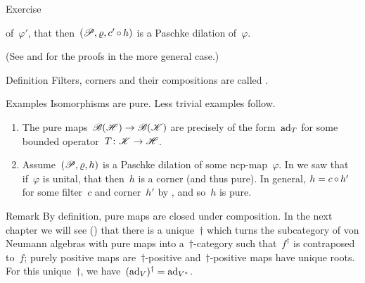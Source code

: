 \documentclass[b]{subfiles}
\begin{document}
\begin{parsec}
\begin{point}{Exercise}
\begin{enumerate}
            of~$\varphi'$,
            that then~$(\mathscr{P}, \varrho, c' \mathop{\circ} h)$
            is a Paschke dilation of~$\varphi$.
\end{enumerate}
(See  and  for the proofs
        in the more general case.)
\end{point}
\begin{point}{Definition}%
Filters, corners and their compositions are called .
\end{point}
\begin{point}{Examples}%
Isomorphisms are pure.  Less trivial examples follow.
\begin{enumerate}
\item
The pure maps~$\mathscr{B}(\mathscr{H}) \to \mathscr{B}(\mathscr{K})$
    are precisely of the form~$\mathrm{ad}_T$
    for some bounded operator~$T\colon \mathscr{K} \to \mathscr{H}$.
\item
Assume~$(\mathscr{P}, \varrho, h)$ is a Paschke dilation of some ncp-map~$\varphi$.
In  we saw that if~$\varphi$ is unital,
        that then~$h$ is a corner (and thus pure).
In general, $h = c \mathop{\circ} h'$ for some filter~$c$ and corner~$h'$
    by ,
        and so~$h$ is pure.
\end{enumerate}
\end{point}
\begin{point}{Remark}%
By definition, pure maps are closed under composition.
In the next chapter we will see () that
    there is a unique~$\dagger$
    which turns the subcategory of von Neumann
    algebras with pure maps into a~$\dagger$-category
    such that~$f^\dagger$ is contraposed to~$f$;
            purely positive maps are~$\dagger$-positive
            and~$\dagger$-positive maps have unique roots.
For this unique~$\dagger$, we have~$(\mathrm{ad}_V)^\dagger = \mathrm{ad}_{V^*}$.
\end{point}
\end{parsec}
\end{document}
